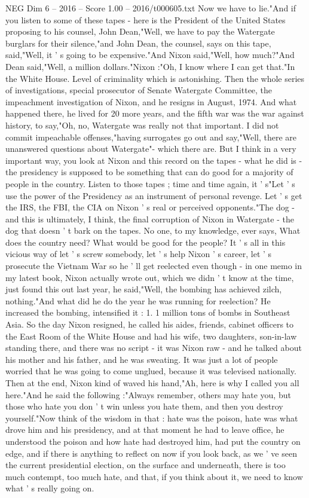 \begin{textsample}{NEG Dim 6 – 2016 – Score 1.00 – 2016/t000605.txt}
Now we have to lie."And if you listen to some of these tapes - here is the President of the United States proposing to his counsel, John Dean,"Well, we have to pay the Watergate burglars for their silence,"and John Dean, the counsel, says on this tape, said,"Well, it ' s going to be expensive."And Nixon said,"Well, how much?"And Dean said,"Well, a million dollars."Nixon :"Oh, I know where I can get that."In the White House.
Level of criminality which is astonishing.
Then the whole series of investigations, special prosecutor of Senate Watergate Committee, the impeachment investigation of Nixon, and he resigns in August, 1974.
And what happened there, he lived for 20 more years, and the fifth war was the war against history, to say,"Oh, no, Watergate was really not that important.
I did not commit impeachable offenses,"having surrogates go out and say,"Well, there are unanswered questions about Watergate"- which there are.
But I think in a very important way, you look at Nixon and this record on the tapes - what he did is - the presidency is supposed to be something that can do good for a majority of people in the country.
Listen to those tapes ; time and time again, it ' s"Let ' s use the power of the Presidency as an instrument of personal revenge.
Let ' s get the IRS, the FBI, the CIA on Nixon ' s real or perceived opponents."The dog - and this is ultimately, I think, the final corruption of Nixon in Watergate - the dog that doesn ' t bark on the tapes.
No one, to my knowledge, ever says, What does the country need?
What would be good for the people?
It ' s all in this vicious way of let ' s screw somebody, let ' s help Nixon ' s career, let ' s prosecute the Vietnam War so he ' ll get reelected even though - in one memo in my latest book, Nixon actually wrote out, which we didn ' t know at the time, just found this out last year, he said,"Well, the bombing has achieved zilch, nothing."And what did he do the year he was running for reelection?
He increased the bombing, intensified it : 1. 1 million tons of bombs in Southeast Asia.
So the day Nixon resigned, he called his aides, friends, cabinet officers to the East Room of the White House and had his wife, two daughters, son-in-law standing there, and there was no script - it was Nixon raw - and he talked about his mother and his father, and he was sweating.
It was just a lot of people worried that he was going to come unglued, because it was televised nationally.
Then at the end, Nixon kind of waved his hand,"Ah, here is why I called you all here."And he said the following :"Always remember, others may hate you, but those who hate you don ' t win unless you hate them, and then you destroy yourself."Now think of the wisdom in that : hate was the poison, hate was what drove him and his presidency, and at that moment he had to leave office, he understood the poison and how hate had destroyed him, had put the country on edge, and if there is anything to reflect on now if you look back, as we ' ve seen the current presidential election, on the surface and underneath, there is too much contempt, too much hate, and that, if you think about it, we need to know what ' s really going on.

\end{textsample}

